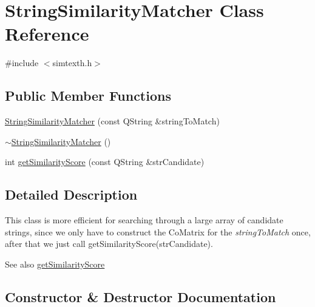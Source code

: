 \hypertarget{classStringSimilarityMatcher}{}\section{String\+Similarity\+Matcher Class Reference}
\label{classStringSimilarityMatcher}


{\ttfamily \#include $<$simtexth.\+h$>$}

\subsection*{Public Member Functions}
\begin{DoxyCompactItemize}
\item 
\hyperlink{classStringSimilarityMatcher_afce621fbd93bb248a00dad0bf5424be0}{String\+Similarity\+Matcher} (const Q\+String \&string\+To\+Match)
\item 
\hyperlink{classStringSimilarityMatcher_ad56caec1c058e1f42ec863394b4fbdf1}{$\sim$\+String\+Similarity\+Matcher} ()
\item 
int \hyperlink{classStringSimilarityMatcher_a612ea73490be259a853e858a821ec516}{get\+Similarity\+Score} (const Q\+String \&str\+Candidate)
\end{DoxyCompactItemize}


\subsection{Detailed Description}
This class is more efficient for searching through a large array of candidate strings, since we only have to construct the Co\+Matrix for the {\itshape string\+To\+Match} once, after that we just call get\+Similarity\+Score(str\+Candidate). \begin{DoxySeeAlso}{See also}
\hyperlink{classStringSimilarityMatcher_a612ea73490be259a853e858a821ec516}{get\+Similarity\+Score} 
\end{DoxySeeAlso}


\subsection{Constructor \& Destructor Documentation}
\hypertarget{classStringSimilarityMatcher_afce621fbd93bb248a00dad0bf5424be0}{}
